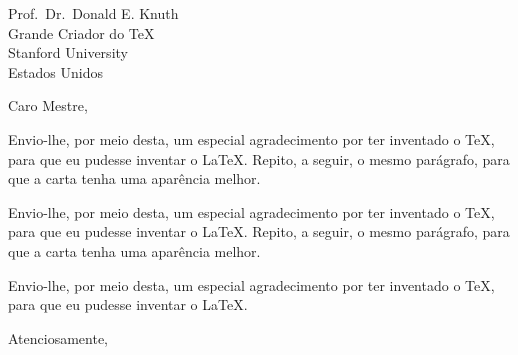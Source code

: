 \documentclass{iiletter}
\begin{document}
\begin{letter}{Prof.~Dr.~Donald E. Knuth\\Grande Criador do \TeX\\Stanford University\\Estados Unidos}

\opening{Caro Mestre,}
	Envio-lhe, por meio desta, um especial agradecimento por ter inventado o \TeX, para que eu pudesse inventar o \LaTeX. Repito, a seguir, o mesmo parágrafo, para que a carta tenha uma aparência melhor.

	Envio-lhe, por meio desta, um especial agradecimento por ter inventado o \TeX, para que eu pudesse inventar o \LaTeX. Repito, a seguir, o mesmo parágrafo, para que a carta tenha uma aparência melhor.

	Envio-lhe, por meio desta, um especial agradecimento por ter inventado o \TeX, para que eu pudesse inventar o \LaTeX.

\closing{Atenciosamente,}
\end{letter}
\end{document}
